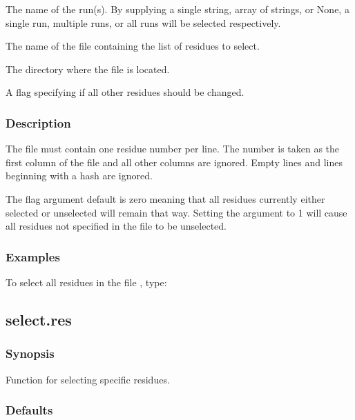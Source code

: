   The name of the run(s).  By supplying a single string, array of strings, or None, a single run, multiple runs, or all runs will be selected respectively.

  The name of the file containing the list of residues to select.

  The directory where the file is located.

  A flag specifying if all other residues should be changed.

\subsubsection{Description}

The file must contain one residue number per line.  The number is taken as the first column
of the file and all other columns are ignored.  Empty lines and lines beginning with a hash
are ignored.

The 
 flag argument default is zero meaning that all residues currently either
selected or unselected will remain that way.  Setting the argument to 1 will cause all
residues not specified in the file to be unselected.


\subsubsection{Examples}

To select all residues in the file 
, type:





\newpage

\subsection{select.res}


\subsubsection{Synopsis}

Function for selecting specific residues.

\subsubsection{Defaults}

